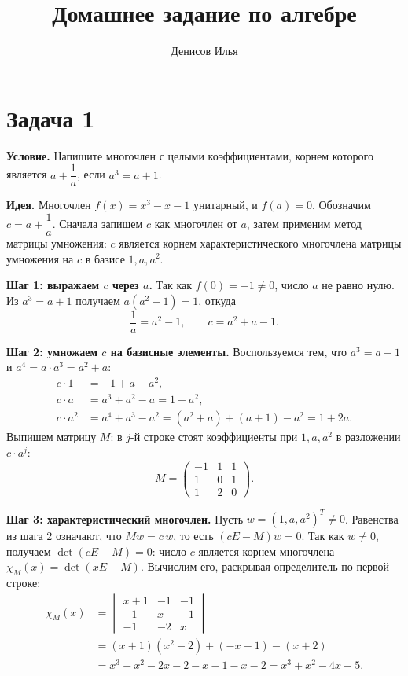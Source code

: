 \documentclass[12pt]{article}
\title{Домашнее задание по алгебре}
\author{Денисов Илья}
\date{}
\begin{document}
	\maketitle

	\section*{Задача 1}

	\noindent
	\textbf{Условие.} Напишите многочлен с целыми коэффициентами, корнем которого является $a + \dfrac{1}{a}$, если $a^3 = a + 1$.

	\medskip
	\noindent
	\textbf{Идея.} Многочлен $f(x) = x^3 - x - 1$ унитарный, и $f(a) = 0$. Обозначим $c = a + \dfrac{1}{a}$. Сначала запишем $c$ как многочлен от $a$, затем применим метод матрицы умножения: $c$ является корнем характеристического многочлена матрицы умножения на $c$ в базисе $1, a, a^2$.

	\medskip
	\noindent
	\textbf{Шаг 1: выражаем $c$ через $a$.} Так как $f(0) = -1 \ne 0$, число $a$ не равно нулю. Из $a^3 = a + 1$ получаем $a(a^2 - 1) = 1$, откуда
	\[
		\frac{1}{a} = a^2 - 1, \qquad c = a^2 + a - 1.
	\]

	\medskip
	\noindent
	\textbf{Шаг 2: умножаем $c$ на базисные элементы.} Воспользуемся тем, что $a^3 = a + 1$ и $a^4 = a \cdot a^3 = a^2 + a$:
	\begin{align*}
		c \cdot 1 &= -1 + a + a^2, \\
		c \cdot a &= a^3 + a^2 - a = 1 + a^2, \\
		c \cdot a^2 &= a^4 + a^3 - a^2 = (a^2 + a) + (a + 1) - a^2 = 1 + 2a.
	\end{align*}
	Выпишем матрицу $M$: в $j$-й строке стоят коэффициенты при $1, a, a^2$ в разложении $c \cdot a^j$:
	\[
		M = \begin{pmatrix}
			-1 & 1 & 1 \\
			1 & 0 & 1 \\
			1 & 2 & 0
		\end{pmatrix}.
	\]

	\medskip
	\noindent
	\textbf{Шаг 3: характеристический многочлен.} Пусть $w = (1, a, a^2)^T \ne 0$. Равенства из шага 2 означают, что $Mw = c\,w$, то есть $(cE - M)w = 0$. Так как $w \ne 0$, получаем $\det(cE - M) = 0$: число $c$ является корнем многочлена $\chi_M(x) = \det(xE - M)$. Вычислим его, раскрывая определитель по первой строке:
	\begin{align*}
		\chi_M(x) &= \begin{vmatrix}
			x + 1 & -1 & -1 \\
			-1 & x & -1 \\
			-1 & -2 & x
		\end{vmatrix} \\
		&= (x + 1)(x^2 - 2) + (-x - 1) - (x + 2) \\
		&= x^3 + x^2 - 2x - 2 - x - 1 - x - 2 = x^3 + x^2 - 4x - 5.
	\end{align*}
\end{document}
